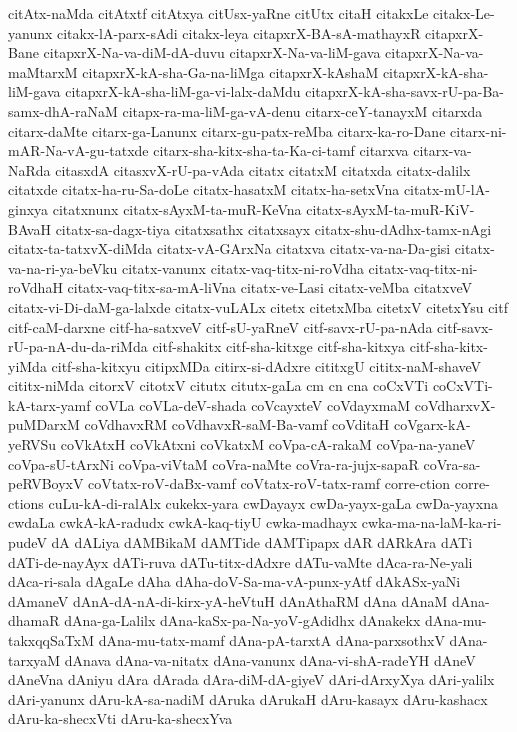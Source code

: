 {citAtx-naMda
citAtxtf
citAtxya
citUsx-yaRne
citUtx
citaH
citakxLe
citakx-Le-yanunx
citakx-lA-parx-sAdi
citakx-leya
citapxrX-BA-sA-mathayxR
citapxrX-Bane
citapxrX-Na-va-diM-dA-duvu
citapxrX-Na-va-liM-gava
citapxrX-Na-va-maMtarxM
citapxrX-kA-sha-Ga-na-liMga
citapxrX-kAshaM
citapxrX-kA-sha-liM-gava
citapxrX-kA-sha-liM-ga-vi-lalx-daMdu
citapxrX-kA-sha-savx-rU-pa-Ba-samx-dhA-raNaM
citapx-ra-ma-liM-ga-vA-denu
citarx-ceY-tanayxM
citarxda
citarx-daMte
citarx-ga-Lanunx
citarx-gu-patx-reMba
citarx-ka-ro-Dane
citarx-ni-mAR-Na-vA-gu-tatxde
citarx-sha-kitx-sha-ta-Ka-ci-tamf
citarxva
citarx-va-NaRda
citasxdA
citasxvX-rU-pa-vAda
citatx
citatxM
citatxda
citatx-dalilx
citatxde
citatx-ha-ru-Sa-doLe
citatx-hasatxM
citatx-ha-setxVna
citatx-mU-lA-ginxya
citatxnunx
citatx-sAyxM-ta-muR-KeVna
citatx-sAyxM-ta-muR-KiV-BAvaH
citatx-sa-dagx-tiya
citatxsathx
citatxsayx
citatx-shu-dAdhx-tamx-nAgi
citatx-ta-tatxvX-diMda
citatx-vA-GArxNa
citatxva
citatx-va-na-Da-gisi
citatx-va-na-ri-ya-beVku
citatx-vanunx
citatx-vaq-titx-ni-roVdha
citatx-vaq-titx-ni-roVdhaH
citatx-vaq-titx-sa-mA-liVna
citatx-ve-Lasi
citatx-veMba
citatxveV
citatx-vi-Di-daM-ga-lalxde
citatx-vuLALx
citetx
citetxMba
citetxV
citetxYsu
citf
citf-caM-darxne
citf-ha-satxveV
citf-sU-yaRneV
citf-savx-rU-pa-nAda
citf-savx-rU-pa-nA-du-da-riMda
citf-shakitx
citf-sha-kitxge
citf-sha-kitxya
citf-sha-kitx-yiMda
citf-sha-kitxyu
citipxMDa
citirx-si-dAdxre
cititxgU
cititx-naM-shaveV
cititx-niMda
citorxV
citotxV
citutx
citutx-gaLa
cm
cn
cna
coCxVTi
coCxVTi-kA-tarx-yamf
coVLa
coVLa-deV-shada
coVcayxteV
coVdayxmaM
coVdharxvX-puMDarxM
coVdhavxRM
coVdhavxR-saM-Ba-vamf
coVditaH
coVgarx-kA-yeRVSu
coVkAtxH
coVkAtxni
coVkatxM
coVpa-cA-rakaM
coVpa-na-yaneV
coVpa-sU-tArxNi
coVpa-viVtaM
coVra-naMte
coVra-ra-jujx-sapaR
coVra-sa-peRVBoyxV
coVtatx-roV-daBx-vamf
coVtatx-roV-tatx-ramf
corre-ction
corre-ctions
cuLu-kA-di-ralAlx
cukekx-yara
cwDayayx
cwDa-yayx-gaLa
cwDa-yayxna
cwdaLa
cwkA-kA-radudx
cwkA-kaq-tiyU
cwka-madhayx
cwka-ma-na-laM-ka-ri-pudeV
dA
dALiya
dAMBikaM
dAMTide
dAMTipapx
dAR
dARkAra
dATi
dATi-de-nayAyx
dATi-ruva
dATu-titx-dAdxre
dATu-vaMte
dAca-ra-Ne-yali
dAca-ri-sala
dAgaLe
dAha
dAha-doV-Sa-ma-vA-punx-yAtf
dAkASx-yaNi
dAmaneV
dAnA-dA-nA-di-kirx-yA-heVtuH
dAnAthaRM
dAna
dAnaM
dAna-dhamaR
dAna-ga-Lalilx
dAna-kaSx-pa-Na-yoV-gAdidhx
dAnakekx
dAna-mu-takxqqSaTxM
dAna-mu-tatx-mamf
dAna-pA-tarxtA
dAna-parxsothxV
dAna-tarxyaM
dAnava
dAna-va-nitatx
dAna-vanunx
dAna-vi-shA-radeYH
dAneV
dAneVna
dAniyu
dAra
dArada
dAra-diM-dA-giyeV
dAri-dArxyXya
dAri-yalilx
dAri-yanunx
dAru-kA-sa-nadiM
dAruka
dArukaH
dAru-kasayx
dAru-kashacx
dAru-ka-shecxVti
dAru-ka-shecxYva
}
